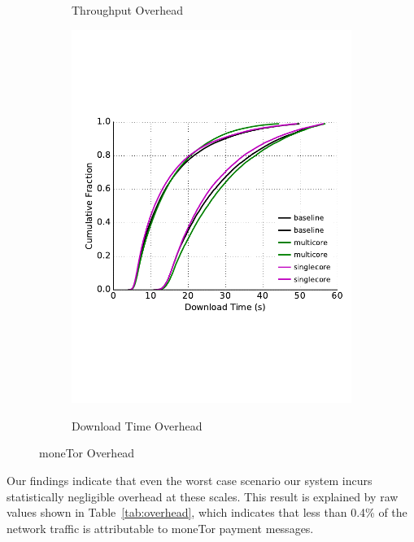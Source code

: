 \begin{figure}
\begin{subfigure}[t]{0.32\textwidth}
		\label{fig:stats_a}
		\caption{Throughput Overhead}
	\end{subfigure}
	\begin{subfigure}[t]{0.32\textwidth} \centering
\includegraphics[trim={0 3cm 0 3cm}, clip, width=1.0\textwidth]{images/overhead_downloadtime.pdf}
		\label{fig:stats_b}
		\caption{Download Time Overhead}
	\end{subfigure}
	\label{fig:measurements}
	\caption{moneTor Overhead}
\end{figure}

Our findings indicate that even the worst case scenario our system incurs
statistically negligible overhead at these scales. This result is explained by
raw values shown in Table~\ref{tab:overhead}, which indicates that less than
0.4\% of the network traffic is attributable to moneTor payment messages.

